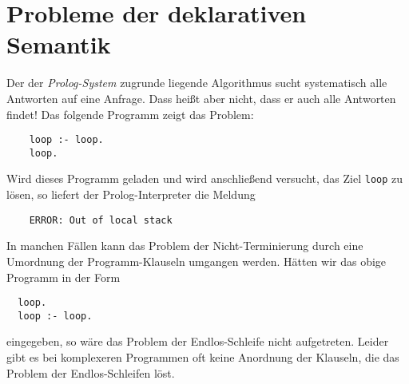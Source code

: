 \section{Probleme der deklarativen Semantik}
Der der \textsl{Prolog-System} zugrunde liegende Algorithmus sucht systematisch alle
Antworten auf eine Anfrage.  Dass heißt aber nicht,
dass er auch alle Antworten  findet!   Das folgende Programm zeigt das Problem:
\begin{verbatim}
    loop :- loop.
    loop.
\end{verbatim}
Wird dieses Programm geladen und wird anschließend versucht, das Ziel \texttt{loop} zu
l\"{o}sen, so liefert der Prolog-Interpreter die Meldung
\begin{verbatim}
    ERROR: Out of local stack
\end{verbatim}

In manchen F\"{a}llen kann  das Problem der Nicht-Terminierung 
 durch eine Umordnung der Programm-Klauseln umgangen werden.
H\"{a}tten wir das obige Programm in  der Form
\begin{verbatim}
  loop.
  loop :- loop.
\end{verbatim}
eingegeben, so w\"{a}re das Problem der Endlos-Schleife nicht aufgetreten.  Leider gibt es bei
komplexeren Programmen oft keine Anordnung der Klauseln, die das Problem der
Endlos-Schleifen l\"{o}st.  


